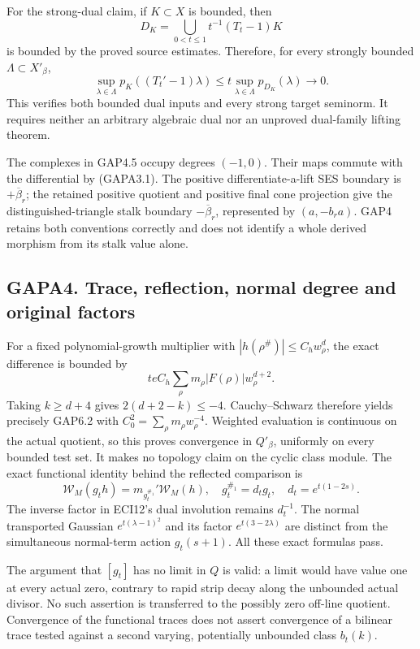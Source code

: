 For the strong-dual claim, if \(K\subset X\) is bounded, then \[
D_K=\bigcup_{0<t\le1}t^{-1}(T_t-1)K
\] is bounded by the proved source estimates. Therefore, for every
strongly bounded \(\Lambda\subset X'_\beta\), \[
\sup_{\lambda\in\Lambda}p_K((T_t'-1)\lambda)
\le t\sup_{\lambda\in\Lambda}p_{D_K}(\lambda)\longrightarrow0.
\tag{GAPA3.3}
\] This verifies both bounded dual inputs and every strong target
seminorm. It requires neither an arbitrary algebraic dual nor an
unproved dual-family lifting theorem.

The complexes in GAP4.5 occupy degrees \((-1,0)\). Their maps commute
with the differential by (GAPA3.1). The positive differentiate-a-lift
SES boundary is \(+\overline\beta_r\); the retained positive quotient
and positive final cone projection give the distinguished-triangle stalk
boundary \(-\overline\beta_r\), represented by \((a,-b_ra)\). GAP4
retains both conventions correctly and does not identify a whole derived
morphism from its stalk value alone.

\subsection{GAPA4. Trace, reflection, normal degree and original
factors}\label{gapa4.-trace-reflection-normal-degree-and-original-factors}

For a fixed polynomial-growth multiplier with
\(|h(\rho^\#)|\le C_hw_\rho^d\), the exact difference is bounded by \[
teC_h\sum_\rho m_\rho|F(\rho)|w_\rho^{d+2}.
\] Taking \(k\ge d+4\) gives \(2(d+2-k)\le-4\). Cauchy--Schwarz
therefore yields precisely GAP6.2 with
\(C_0^2=\sum_\rho m_\rho w_\rho^{-4}\). Weighted evaluation is
continuous on the actual quotient, so this proves convergence in
\(Q'_\beta\), uniformly on every bounded test set. It makes no topology
claim on the cyclic class module. The exact functional identity behind
the reflected comparison is \[
\mathcal W_M(g_th)=m_{g_t^{\#_1}}'\mathcal W_M(h),
\quad g_t^{\#_1}=d_tg_t,
\quad d_t=e^{t(1-2s)}.
\tag{GAPA4.1}
\] The inverse factor in ECI12's dual involution remains \(d_t^{-1}\).
The normal transported Gaussian \(e^{t(\lambda-1)^2}\) and its factor
\(e^{t(3-2\lambda)}\) are distinct from the simultaneous normal-term
action \(g_t(s+1)\). All these exact formulas pass.

The argument that \([g_t]\) has no limit in \(Q\) is valid: a limit
would have value one at every actual zero, contrary to rapid strip decay
along the unbounded actual divisor. No such assertion is transferred to
the possibly zero off-line quotient. Convergence of the functional
traces does not assert convergence of a bilinear trace tested against a
second varying, potentially unbounded class \(b_t(k)\).

